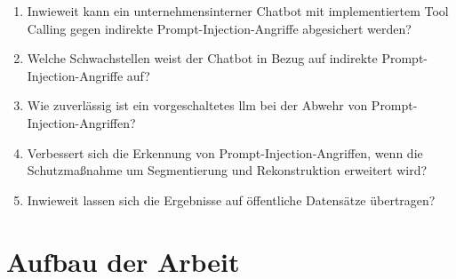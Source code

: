 \begin{enumerate}
    \item[Hauptforschungsfrage:] Inwieweit kann ein unternehmensinterner Chatbot mit implementiertem Tool Calling gegen indirekte Prompt-Injection-Angriffe abgesichert werden?
    \item[Teilforschungsfrage 1:] Welche Schwachstellen weist der Chatbot in Bezug auf indirekte Prompt-Injection-Angriffe auf?
    \item[Teilforschungsfrage 2:] Wie zuverlässig ist ein vorgeschaltetes \ac{llm} bei der Abwehr von Prompt-Injection-Angriffen?
    \item[Teilforschungsfrage 3:] Verbessert sich die Erkennung von Prompt-Injection-Angriffen, wenn die Schutzmaßnahme um Segmentierung und Rekonstruktion erweitert wird?
    \item[Teilforschungsfrage 4:] Inwieweit lassen sich die Ergebnisse auf öffentliche Datensätze übertragen?
\end{enumerate}

\section{Aufbau der Arbeit}

